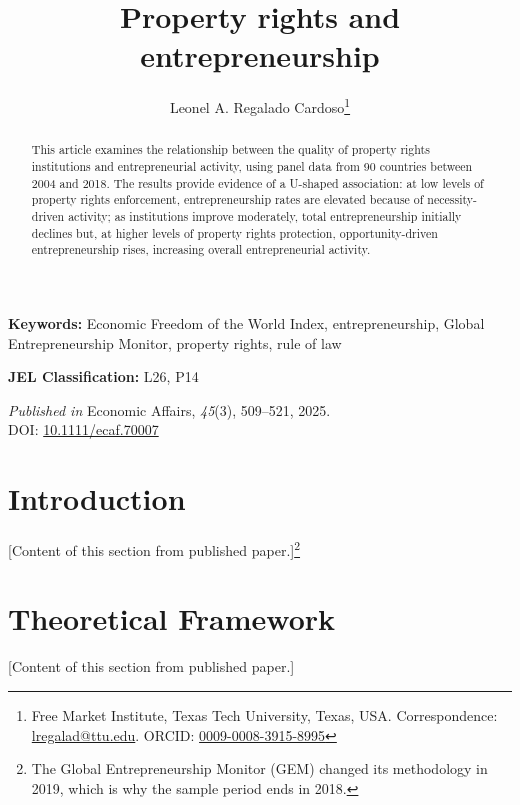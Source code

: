 \documentclass[12pt]{article}
\title{\textbf{Property rights and entrepreneurship}}
\author{
    Leonel A. Regalado Cardoso\thanks{Free Market Institute, Texas Tech University, Texas, USA. Correspondence: \href{mailto:lregalad@ttu.edu}{lregalad@ttu.edu}. ORCID: \href{https://orcid.org/0009-0008-3915-8995}{0009-0008-3915-8995}}
}
\date{}
\begin{document}
\maketitle

\begin{abstract}
    This article examines the relationship between the quality of property rights institutions and entrepreneurial activity, using panel data from 90 countries between 2004 and 2018. The results provide evidence of a U-shaped association: at low levels of property rights enforcement, entrepreneurship rates are elevated because of necessity-driven activity; as institutions improve moderately, total entrepreneurship initially declines but, at higher levels of property rights protection, opportunity-driven entrepreneurship rises, increasing overall entrepreneurial activity.
\end{abstract}

\noindent\textbf{Keywords:} Economic Freedom of the World Index, entrepreneurship, Global Entrepreneurship Monitor, property rights, rule of law

\noindent\textbf{JEL Classification:} L26, P14

\bigskip
\noindent\textit{Published in} Economic Affairs, \textit{45}(3), 509--521, 2025.\\
\noindent DOI: \href{https://doi.org/10.1111/ecaf.70007}{10.1111/ecaf.70007}

\newpage

\section{Introduction}\label{sec:introduction}

[Content of this section from published paper.]\footnote{The Global Entrepreneurship Monitor (GEM) changed its methodology in 2019, which is why the sample period ends in 2018.}

\section{Theoretical Framework}\label{sec:theoretical_framework}

[Content of this section from published paper.]

\end{document}
